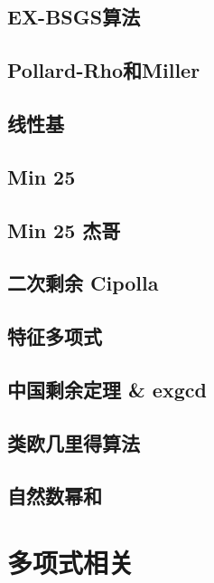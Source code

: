 \documentclass[a4paper,12pt]{article}
\begin{document}
\subsection{EX-BSGS算法}

\subsection{Pollard-Rho和Miller}

\subsection{线性基}



\subsection{Min 25}

\subsection{Min 25 杰哥}

\subsection{二次剩余 Cipolla}

\subsection{特征多项式}

\subsection{中国剩余定理 \& exgcd}

\subsection{类欧几里得算法}

\subsection{自然数幂和}


\section{多项式相关}
\end{document}
